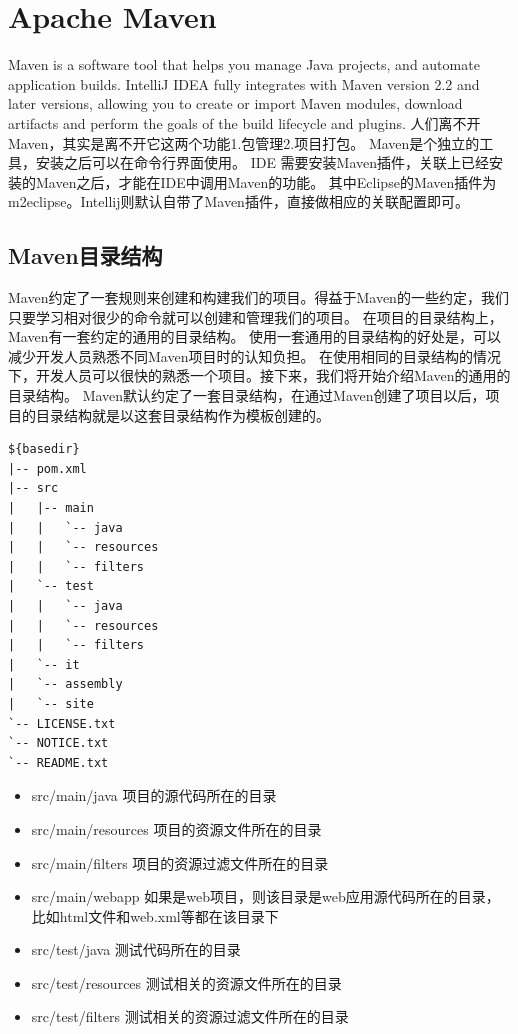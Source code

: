 \documentclass{book}
\begin{document}
\section{Apache Maven}

Maven is a software tool that helps you manage Java projects, 
and automate application builds. IntelliJ IDEA fully integrates with Maven version 2.2 and later versions, 
allowing you to create or import Maven modules, download artifacts and perform the goals 
of the build lifecycle and plugins.
人们离不开Maven，其实是离不开它这两个功能1.包管理2.项目打包。
Maven是个独立的工具，安装之后可以在命令行界面使用。
IDE 需要安装Maven插件，关联上已经安装的Maven之后，才能在IDE中调用Maven的功能。
其中Eclipse的Maven插件为m2eclipse。Intellij则默认自带了Maven插件，直接做相应的关联配置即可。

\subsection{Maven目录结构}

Maven约定了一套规则来创建和构建我们的项目。得益于Maven的一些约定，我们只要学习相对很少的命令就可以创建和管理我们的项目。
在项目的目录结构上，Maven有一套约定的通用的目录结构。
使用一套通用的目录结构的好处是，可以减少开发人员熟悉不同Maven项目时的认知负担。
在使用相同的目录结构的情况下，开发人员可以很快的熟悉一个项目。接下来，我们将开始介绍Maven的通用的目录结构。
Maven默认约定了一套目录结构，在通过Maven创建了项目以后，项目的目录结构就是以这套目录结构作为模板创建的。

\begin{lstlisting}
${basedir}
|-- pom.xml
|-- src
|   |-- main
|   |   `-- java
|   |   `-- resources
|   |   `-- filters
|   `-- test
|   |   `-- java
|   |   `-- resources
|   |   `-- filters
|   `-- it
|   `-- assembly
|   `-- site
`-- LICENSE.txt
`-- NOTICE.txt
`-- README.txt
\end{lstlisting}


\begin{itemize}
	\item{src/main/java 项目的源代码所在的目录}
	\item{src/main/resources 项目的资源文件所在的目录}
	\item{src/main/filters 项目的资源过滤文件所在的目录}
	\item{src/main/webapp 如果是web项目，则该目录是web应用源代码所在的目录，比如html文件和web.xml等都在该目录下}
	\item{src/test/java 测试代码所在的目录}
	\item{src/test/resources 测试相关的资源文件所在的目录}
	\item{src/test/filters 测试相关的资源过滤文件所在的目录}
\end{itemize} 
\end{document}
